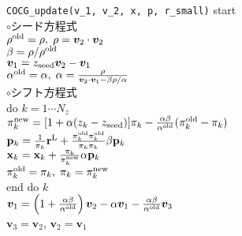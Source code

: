 \documentclass[12pt,titlepage]{jarticle}
\renewenvironment{leftbar}{%
  \def\FrameCommand{\vrule width 1pt \hspace{0pt}}%
  \MakeFramed {\advance\hsize-\width \FrameRestore}}%
 {\endMakeFramed}
\begin{document}
\begin{leftbar}
  \noindent
  \hspace{0.5cm}
  \verb|COCG_update(v_1, v_2, x, p, r_small)| start
  \\\hspace{1.0cm}
  $\circ$シード方程式
  \\\hspace{1.0cm}
  $\rho^{\rm old} = \rho,\; \rho = {\boldsymbol v}_2 \cdot {\boldsymbol v}_2$
  \\\hspace{1.0cm}
  $\beta = \rho / \rho^{\rm old}$
  \\\hspace{1.0cm}
  ${\boldsymbol v}_1 = z_{\rm seed} {\boldsymbol v}_2 - {\boldsymbol v}_1$
  \\\hspace{1.0cm}
  $\alpha^{\rm old} = \alpha,\; 
  \alpha = \frac{\rho}{{\boldsymbol v}_2 \cdot {\boldsymbol v}_1 - \beta \rho / \alpha }$
  \\\hspace{1.0cm}
  $\circ$シフト方程式
  \\\hspace{1.0cm}
  do $k = 1 \cdots N_z$
  \\\hspace{1.5cm}
  $\pi_k^{\rm new} = [1+\alpha(z_k-z_{\rm seed})]\pi_k - \frac{\alpha \beta}{\alpha^{\rm old}}(\pi_k^{\rm old} - \pi_k)$
  \\\hspace{1.5cm}
  ${\bf p}_{k} = \frac{1}{\pi_k} {\bf r}^{\rm L} + 
  \frac{\pi^{\rm old}_k \pi^{\rm old}_k}{\pi_k \pi_k} \beta {\bf p}_{k}$
  \\\hspace{1.5cm}
  ${\bf x}_{k} = {\bf x}_{k} + \frac{\pi_k}{\pi_k^{\rm new}} \alpha {\bf p}_{k}$
  \\\hspace{1.5cm}
  $\pi_k^{\rm old} = \pi_k,\; \pi_k = \pi_k^{\rm new}$
  \\\hspace{1.0cm}
  end do $k$
  \\\hspace{1.0cm}
  ${\boldsymbol v}_1 = \left( 1 + \frac{\alpha \beta}{\alpha^{\rm old}} \right) {\boldsymbol v}_2
  - \alpha {\boldsymbol v}_1 - \frac{\alpha \beta}{\alpha^{\rm old}} {\boldsymbol v}_3$
  \\\hspace{1.0cm}
  ${\boldsymbol v}_3 = {\boldsymbol v}_2$,
  ${\boldsymbol v}_2 = {\boldsymbol v}_1$

\end{leftbar}
\end{document}
